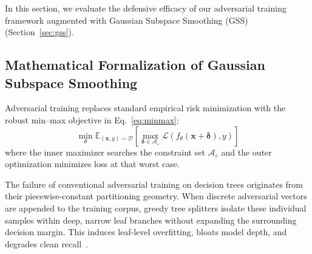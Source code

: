 \documentclass[iicol,pdflatex,sn-mathphys-num]{sn-jnl}
\begin{document}
In this section, we evaluate the defensive efficacy of our adversarial training framework augmented with Gaussian Subspace Smoothing (GSS) (Section~\ref{sec:gss}).

\subsection{Mathematical Formalization of Gaussian Subspace Smoothing}
Adversarial training replaces standard empirical risk minimization with the robust min--max objective in Eq.~\eqref{eq:minmax}:
\begin{equation}
\label{eq:minmax}
    \min_\theta \mathbb{E}_{(\mathbf{x}, y) \sim \mathcal{D}} \left[ \max_{\boldsymbol{\delta} \in \mathcal{A}_\varepsilon} \mathcal{L}(f_\theta(\mathbf{x} + \boldsymbol{\delta}), y) \right]
\end{equation}
where the inner maximizer searches the constraint set $\mathcal{A}_\varepsilon$ and the outer optimization minimizes loss at that worst case.

The failure of conventional adversarial training on decision trees originates from their piecewise-constant partitioning geometry. When discrete adversarial vectors are appended to the training corpus, greedy tree splitters isolate these individual samples within deep, narrow leaf branches without expanding the surrounding decision margin. This induces leaf-level overfitting, bloats model depth, and degrades clean recall~\cite{tramer2020adaptive,vos2024adversarial}.
\end{document}

